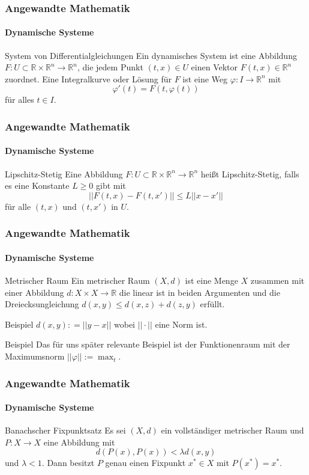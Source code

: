 \documentclass{beamer}
\begin{document}
\begin{frame}
    \frametitle{Angewandte Mathematik}
\framesubtitle{Dynamische Systeme }
\begin{block}{System von Differentialgleichungen}
Ein dynamisches System ist eine  Abbildung $F : U \subset \mathbb{R} \times \mathbb{R}^n \to \mathbb{R}^n$, die jedem Punkt $(t,x)  \in U$ einen Vektor $F(t,x) \in \mathbb{R}^n$ zuordnet. Eine Integralkurve oder Lösung für $F$ ist eine Weg $\varphi : I \to \mathbb{R}^n$ mit 
$$\varphi'(t) = F(t, \varphi(t)) $$
für alles $t \in I$.
\end{block}
 \end{frame}



\begin{frame}
    \frametitle{Angewandte Mathematik}
\framesubtitle{Dynamische Systeme }
\begin{block}{Lipschitz-Stetig}
Eine  Abbildung $F : U \subset \mathbb{R} \times \mathbb{R}^n \to \mathbb{R}^n$ heißt Lipschitz-Stetig,
falls es eine Konstante $L \geq 0$ gibt  mit
$$ || F(t,x) - F(t,x') ||  \leq L || x -x' ||  $$
für alle $(t,x)$ und $(t,x')$ in $U$.
\end{block}

 \end{frame}


\begin{frame}
    \frametitle{Angewandte Mathematik}
\framesubtitle{Dynamische Systeme }
\begin{block}{Metrischer Raum}
Ein metrischer Raum $(X,d)$ ist eine Menge $X$ zusammen mit einer Abbildung $d : X \times X \to \mathbb{R}$ die linear ist in beiden Argumenten und die Dreiecksungleichung $d(x,y) \leq d(x,z) + d(z,y)$ erfüllt.  
\end{block}
\begin{block}{Beispiel}
$d(x,y) : = || y- x  ||$  wobei $||  \cdot ||$  eine Norm ist. 
\end{block}

\begin{block}{Beispiel}
Das für uns später relevante Beispiel ist der Funktionenraum mit der Maximumsnorm $|| \varphi || := \max_t$.
\end{block}
 \end{frame}


\begin{frame}
    \frametitle{Angewandte Mathematik}
\framesubtitle{Dynamische Systeme }
\begin{block}{Banachscher Fixpunktsatz}
Es sei $(X,d)$ ein vollständiger metrischer Raum und $P: X \to X$ eine Abbildung mit $$d(P(x), P(x)) < \lambda d(x,y)$$ und $\lambda < 1$. Dann besitzt $P$ genau einen Fixpunkt $x^* \in X$ mit $P(x^*) = x^*$.

\end{block}

 \end{frame}
\end{document}

